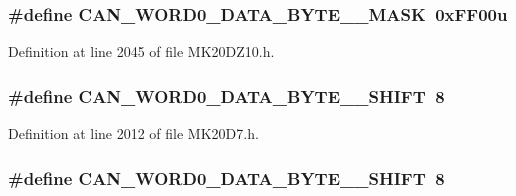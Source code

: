 \subsubsection[{\texorpdfstring{C\+A\+N\+\_\+\+W\+O\+R\+D0\+\_\+\+D\+A\+T\+A\+\_\+\+B\+Y\+T\+E\+\_\+2\+\_\+\+M\+A\+SK}{CAN_WORD0_DATA_BYTE_2_MASK}}]{\setlength{\rightskip}{0pt plus 5cm}\#define C\+A\+N\+\_\+\+W\+O\+R\+D0\+\_\+\+D\+A\+T\+A\+\_\+\+B\+Y\+T\+E\+\_\+\_\+\+M\+A\+SK~0x\+F\+F00u}\hypertarget{group___c_a_n___register___masks_gaf5ac3a0da0156c6c331ae39e688d1a6b}{}\label{group___c_a_n___register___masks_gaf5ac3a0da0156c6c331ae39e688d1a6b}


Definition at line 2045 of file M\+K20\+D\+Z10.\+h.

\subsubsection[{\texorpdfstring{C\+A\+N\+\_\+\+W\+O\+R\+D0\+\_\+\+D\+A\+T\+A\+\_\+\+B\+Y\+T\+E\+\_\+2\+\_\+\+S\+H\+I\+FT}{CAN_WORD0_DATA_BYTE_2_SHIFT}}]{\setlength{\rightskip}{0pt plus 5cm}\#define C\+A\+N\+\_\+\+W\+O\+R\+D0\+\_\+\+D\+A\+T\+A\+\_\+\+B\+Y\+T\+E\+\_\+\_\+\+S\+H\+I\+FT~8}\hypertarget{group___c_a_n___register___masks_ga30489eaec721b5f42b721c65d8c0cf67}{}\label{group___c_a_n___register___masks_ga30489eaec721b5f42b721c65d8c0cf67}


Definition at line 2012 of file M\+K20\+D7.\+h.

\subsubsection[{\texorpdfstring{C\+A\+N\+\_\+\+W\+O\+R\+D0\+\_\+\+D\+A\+T\+A\+\_\+\+B\+Y\+T\+E\+\_\+2\+\_\+\+S\+H\+I\+FT}{CAN_WORD0_DATA_BYTE_2_SHIFT}}]{\setlength{\rightskip}{0pt plus 5cm}\#define C\+A\+N\+\_\+\+W\+O\+R\+D0\+\_\+\+D\+A\+T\+A\+\_\+\+B\+Y\+T\+E\+\_\+\_\+\+S\+H\+I\+FT~8}\hypertarget{group___c_a_n___register___masks_ga30489eaec721b5f42b721c65d8c0cf67}{}\label{group___c_a_n___register___masks_ga30489eaec721b5f42b721c65d8c0cf67}


